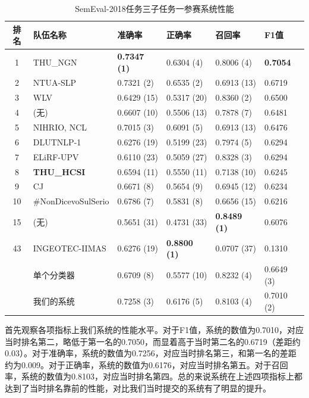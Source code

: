 \begin{table}[htb]
  \centering
  \begin{minipage}[t]{\linewidth}
  \caption{SemEval-2018任务三子任务一参赛系统性能} %
  \label{tab:exp_irony_det_A_other_comp}
    \begin{tabularx}{\linewidth}{c|X|llll}
    \toprule[1.5pt]
    排名 & 队伍名称 & 准确率 & 正确率 & 召回率 & F1值 \\
    \hline 
    1 & THU\_NGN & \bf 0.7347 (1) & 0.6304 (4) & 0.8006 (4) & \bf 0.7054 \\
    2 & NTUA-SLP & 0.7321 (2) & 0.6535 (2) & 0.6913 (13) & 0.6719 \\
    3 & WLV & 0.6429 (15) & 0.5317 (20) & 0.8360 (2) & 0.6500 \\
    4 & (无) & 0.6607 (10) & 0.5506 (13) & 0.7878 (7) & 0.6481 \\
    5 & NIHRIO, NCL & 0.7015 (3) & 0.6091 (5) & 0.6913 (13) & 0.6476 \\
    6 & DLUTNLP-1 & 0.6276 (19) & 0.5199 (23) & 0.7974 (5) & 0.6294 \\
    7 & ELiRF-UPV & 0.6110 (23) & 0.5059 (27) & 0.8328 (3) & 0.6294 \\
    8 & \bf THU\_HCSI & 0.6594 (11) & 0.5550 (11) & 0.7138 (10) & 0.6245 \\
    9 & CJ & 0.6671 (8) & 0.5654 (9) & 0.6945 (12) & 0.6234 \\ 
    10 & \#NonDicevoSulSerio & 0.6786 (7) & 0.5831 (8) & 0.6656 (15) & 0.6216 \\
    \hline
    15 & (无) & 0.5651 (31) & 0.4731 (33) & \bf 0.8489 (1) & 0.6076 \\
    \hline
    43 & INGEOTEC-IIMAS & 0.6276 (19) & \bf 0.8800 (1) & 0.0707 (37) & 0.1310 \\
    \hline 
    & 单个分类器 & 0.6709 (8) & 0.5577 (10) & 0.8232 (4) & 0.6649 (3) \\ %
    & 我们的系统 & 0.7258 (3) & 0.6176 (5) & 0.8103 (4) & 0.7010 (2) \\
    \bottomrule[1.5pt]
    \end{tabularx}
  \end{minipage}
\end{table}

首先观察各项指标上我们系统的性能水平。对于F1值，系统的数值为0.7010，对应当时排名第二，略低于第一名的0.7050，而显着高于当时第二名的0.6719（差距约0.03）。对于准确率，系统的数值为0.7256，对应当时排名第三，和第一名的差距约为0.009。对于正确率，系统的数值为0.6176，对应当时排名第五。对于召回率，系统的数值为0.8103，对应当时排名第四。总的来说系统在上述四项指标上都达到了当时排名靠前的性能，对比我们当时提交的系统有了明显的提升。

